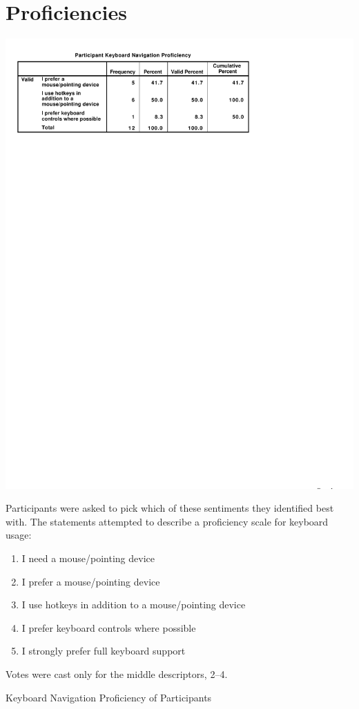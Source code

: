 \documentclass[11pt,openright,a4paper]{report}
\begin{document}
\section{Proficiencies}
\begin{table}[ht]
\centerline{\includegraphics{figures/Proficiency.pdf}}
\label{fig:partic_proficiency}
\medskip
\small
Participants were asked to pick which of these sentiments they identified best with. The statements attempted to describe a proficiency scale for keyboard usage:
\begin{enumerate}
\item I need a mouse/pointing device
\item I prefer a mouse/pointing device
\item I use hotkeys in addition to a mouse/pointing device
\item I prefer keyboard controls where possible
\item I strongly prefer full keyboard support
\end{enumerate}
Votes were cast only for the middle descriptors, 2--4.
\caption{Keyboard Navigation Proficiency of Participants}

\end{table}
\end{document}
